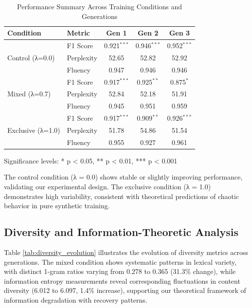 \documentclass{article}
\begin{document}
\begin{table}[H]
\centering
\caption{Performance Summary Across Training Conditions and Generations}
\label{tab:performance_summary}
\begin{tabular}{llccc}
\toprule
\textbf{Condition} & \textbf{Metric} & \textbf{Gen 1} & \textbf{Gen 2} & \textbf{Gen 3} \\
\midrule
\multirow{3}{*}{Control (λ=0.0)} & F1 Score & 0.921$^{***}$ & 0.946$^{***}$ & 0.952$^{***}$ \\
 & Perplexity & 52.65 & 52.82 & 52.92 \\
 & Fluency & 0.947 & 0.946 & 0.946 \\
\midrule
\multirow{3}{*}{Mixed (λ=0.7)} & F1 Score & 0.917$^{***}$ & 0.925$^{**}$ & 0.875$^{*}$ \\
 & Perplexity & 52.84 & 52.18 & 51.91 \\
 & Fluency & 0.945 & 0.951 & 0.959 \\
\midrule
\multirow{3}{*}{Exclusive (λ=1.0)} & F1 Score & 0.917$^{***}$ & 0.909$^{**}$ & 0.926$^{***}$ \\
 & Perplexity & 51.78 & 54.86 & 51.54 \\
 & Fluency & 0.955 & 0.927 & 0.961 \\
\bottomrule
\end{tabular}
\footnotesize{Significance levels: * p < 0.05, ** p < 0.01, *** p < 0.001}
\end{table}

The control condition (λ = 0.0) shows stable or slightly improving performance, validating our experimental design. The exclusive condition (λ = 1.0) demonstrates high variability, consistent with theoretical predictions of chaotic behavior in pure synthetic training.

\subsection{Diversity and Information-Theoretic Analysis}

Table \ref{tab:diversity_evolution} illustrates the evolution of diversity metrics across generations. The mixed condition shows systematic patterns in lexical variety, with distinct 1-gram ratios varying from 0.278 to 0.365 (31.3\% change), while information entropy measurements reveal corresponding fluctuations in content diversity (6.012 to 6.097, 1.4\% increase), supporting our theoretical framework of information degradation with recovery patterns.
\end{document}
